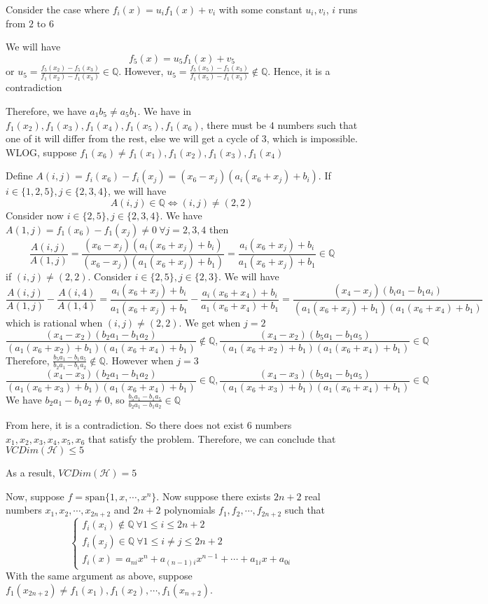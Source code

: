 \documentclass[english, 10pt]{article} %
\begin{document}
Consider the case where $f_i(x) = u_if_1(x)+v_i$ with some constant $u_i,v_i$, $i$ runs from $2$ to $6$

We will have 
$$f_5(x) = u_5f_1(x)+v_5$$
or $u_5 = \frac{f_5(x_2)-f_5(x_3)}{f_1(x_2)-f_1(x_3)} \in \mathbb{Q}$. However, $u_5 = \frac{f_5(x_5)-f_5(x_3)}{f_1(x_5)-f_1(x_3)} \not \in \mathbb{Q}$. Hence, it is a contradiction

Therefore, we have $a_1b_5 \neq a_5b_1$. We have in $f_1(x_2),f_1(x_3),f_1(x_4),f_1(x_5),f_1(x_6)$, there must be $4$ numbers such that one of it will differ from the rest, else we will get a cycle of $3$, which is impossible. WLOG, suppose $f_1(x_6) \neq f_1(x_1),f_1(x_2),f_1(x_3),f_1(x_4)$

Define $A(i,j)=f_i(x_6)-f_i(x_j) = (x_6-x_j)(a_i(x_6+x_j)+b_i)$. If $i \in \{1,2,5 \}, j \in \{2,3,4 \}$, we will have
$$A(i,j) \in \mathbb{Q} \iff (i,j) \neq (2,2)$$
Consider now $i \in \{2,5 \}, j \in \{2,3,4\}$. We have $A(1,j) = f_1(x_6)-f_1(x_j) \neq 0 \ \forall j = 2,3,4$ then
$$\frac{A(i,j)}{A(1,j)} = \frac{(x_6-x_j)(a_i(x_6+x_j)+b_i)}{(x_6-x_j)(a_1(x_6+x_j)+b_1)} = \frac{a_i(x_6+x_j)+b_i}{a_1(x_6+x_j)+b_1} \in \mathbb{Q}$$
if $(i,j) \neq (2,2)$. Consider $i \in \{2,5\}, j \in \{2,3\}$. We will have
$$\frac{A(i,j)}{A(1,j)}-\frac{A(i,4)}{A(1,4)} = \frac{a_i(x_6+x_j)+b_i}{a_1(x_6+x_j)+b_1}-\frac{a_i(x_6+x_4)+b_i}{a_1(x_6+x_4)+b_1} = \frac{(x_4-x_j)(b_ia_1-b_1a_i)}{(a_1(x_6+x_j)+b_1)(a_1(x_6+x_4)+b_1)}$$
which is rational when $(i,j) \neq (2,2)$. We get when $j=2$
$$\frac{(x_4-x_2)(b_2a_1-b_1a_2)}{(a_1(x_6+x_2)+b_1)(a_1(x_6+x_4)+b_1)} \not \in \mathbb{Q}, \frac{(x_4-x_2)(b_5a_1-b_1a_5)}{(a_1(x_6+x_2)+b_1)(a_1(x_6+x_4)+b_1)} \in \mathbb{Q}$$
Therefore, $\frac{b_5a_1-b_1a_5}{b_2a_1-b_1a_2} \not \in \mathbb{Q}$. However when $j=3$
$$\frac{(x_4-x_3)(b_2a_1-b_1a_2)}{(a_1(x_6+x_3)+b_1)(a_1(x_6+x_4)+b_1)} \in \mathbb{Q}, \frac{(x_4-x_3)(b_5a_1-b_1a_5)}{(a_1(x_6+x_3)+b_1)(a_1(x_6+x_4)+b_1)} \in \mathbb{Q}$$
We have $b_2a_1-b_1a_2 \neq 0$, so $\frac{b_5a_1-b_1a_5}{b_2a_1-b_1a_2} \in \mathbb{Q}$

From here, it is a contradiction. So there does not exist $6$ numbers $x_1,x_2,x_3,x_4,x_5,x_6$ that satisfy the problem. Therefore, we can conclude that $VCDim(\mathcal{H}) \leq 5$

As a result, $VCDim(\mathcal{H})=5$
\newpage

Now, suppose $f=\text{span} \{1,x,\cdots,x^n \}$. Now suppose there exists $2n+2$ real numbers $x_1,x_2,\cdots,x_{2n+2}$ and $2n+2$ polynomials $f_1,f_2,\cdots,f_{2n+2}$ such that
$$\begin{cases}
f_i(x_i) \not \in \mathbb{Q} \ \forall 1 \leq i \leq 2n+2\\
f_i(x_j) \in \mathbb{Q} \ \forall 1 \leq i \neq j \leq 2n+2\\
f_i(x) = a_{ni}x^n+a_{(n-1)i}x^{n-1}+\cdots+a_{1i}x+a_{0i}
\end{cases}$$
With the same argument as above, suppose $f_1(x_{2n+2}) \neq f_1(x_1),f_1(x_2),\cdots,f_1(x_{n+2})$.
\end{document}
